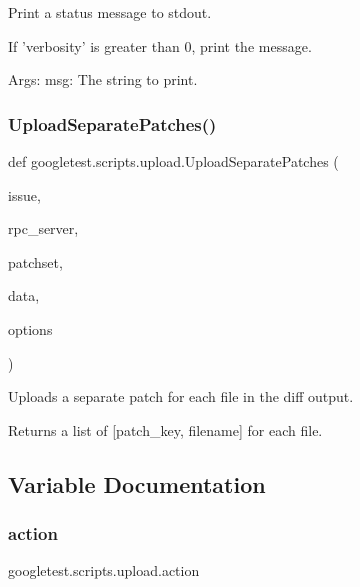 \begin{DoxyVerb}Print a status message to stdout.

If 'verbosity' is greater than 0, print the message.

Args:
  msg: The string to print.
\end{DoxyVerb}
 \mbox{\label{namespacegoogletest_1_1scripts_1_1upload_a50c5e594327556203e22e04b49cefd3b}} 
\subsubsection{\texorpdfstring{UploadSeparatePatches()}{UploadSeparatePatches()}}
{\footnotesize\ttfamily def googletest.\+scripts.\+upload.\+Upload\+Separate\+Patches (\begin{DoxyParamCaption}\item[{}]{issue,  }\item[{}]{rpc\+\_\+server,  }\item[{}]{patchset,  }\item[{}]{data,  }\item[{}]{options }\end{DoxyParamCaption})}

\begin{DoxyVerb}Uploads a separate patch for each file in the diff output.

Returns a list of [patch_key, filename] for each file.
\end{DoxyVerb}
 

\subsection{Variable Documentation}
\mbox{\label{namespacegoogletest_1_1scripts_1_1upload_a472f6039c406e5432e919cea48e2792e}} 
\subsubsection{\texorpdfstring{action}{action}}
{\footnotesize\ttfamily googletest.\+scripts.\+upload.\+action}


